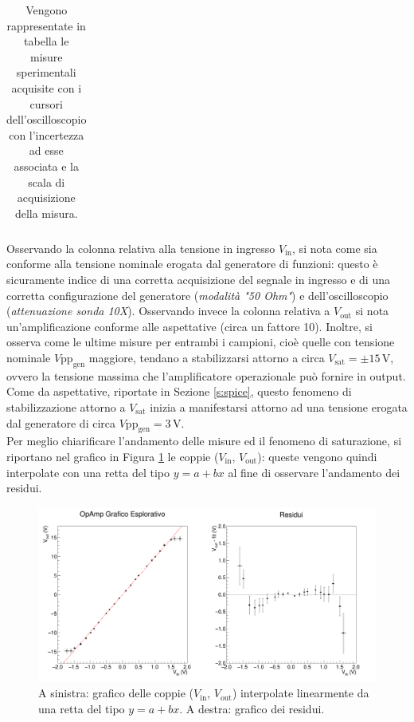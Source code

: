 \documentclass[a4paper,11pt]{article} %
\begin{document}
\begin{table}[H]
\begin{tabular}{x{2cm} x{3cm} x{3.2cm} x{3cm} x{3.2cm}}
		
		\bottomrule[0.5px]
		
	\end{tabular}
	\caption{Vengono rappresentate in tabella le misure sperimentali acquisite con i cursori dell'oscilloscopio 
				con l'incertezza ad esse associata e la scala di acquisizione della misura.}
	\label{t:osc_measures}
\end{table}	

\noindent  Osservando la colonna relativa alla tensione in ingresso $V_{\text{in}}$, si nota come sia conforme alla
tensione nominale erogata dal generatore di funzioni: questo è sicuramente indice di una corretta acquisizione del
segnale in ingresso e di una corretta configurazione del generatore (\textit{modalità "50 Ohm"}) e dell'oscilloscopio
(\textit{attenuazione sonda 10X}). Osservando invece la colonna relativa a $V_{\text{out}}$ si nota un'amplificazione
conforme alle aspettative (circa un fattore 10). Inoltre, si osserva come le ultime misure per entrambi i campioni, cioè
quelle con tensione nominale $V\text{pp}_{\text{gen}}$ maggiore, tendano a stabilizzarsi attorno a circa
$V_{\text{sat}}=\pm15\,\si{\volt}$, ovvero la tensione massima che l'amplificatore operazionale può fornire in output.
Come da aspettative, riportate in Sezione \ref{s:spice}, questo fenomeno di stabilizzazione attorno a $V_{\text{sat}}$
inizia a manifestarsi attorno ad una tensione erogata dal generatore di circa $V\text{pp}_{\text{gen}}=3\,\si{\volt}$.\\
Per meglio chiarificare l'andamento delle misure ed il fenomeno di saturazione, si riportano nel grafico in Figura
\ref{i:opamp_eda} le coppie ($V_{\text{in}}$, $V_{\text{out}}$): queste vengono quindi interpolate con una retta del
tipo $y=a+bx$ al fine di osservare l'andamento dei residui. 

\begin{figure}[H]
	\centering
	\includegraphics[width=\linewidth]{../Plots/Report_Plots/opamp_plot_alldata_eda.png}
	\caption{A sinistra: grafico delle coppie ($V_{\text{in}}$, $V_{\text{out}}$) interpolate linearmente da una retta
	del tipo $y=a+bx$. A destra: grafico dei residui.}
	\label{i:opamp_eda}
\end{figure}
\end{document}
